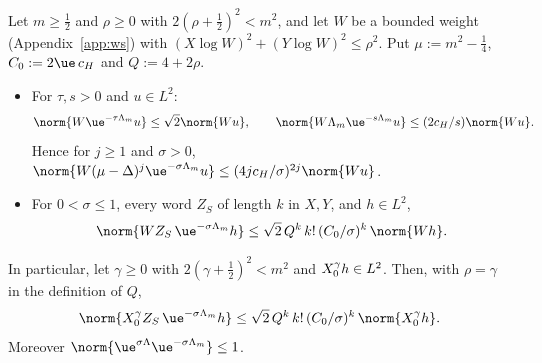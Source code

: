 \begin{lemma}\label{os:words}
Let $m\ge\tfrac12$ and $\rho\ge0$ with $2(\rho+\tfrac12)^2<m^2$, and let $W$ be a bounded weight (Appendix~\ref{app:ws}) with
$(X\log W)^2+(Y\log W)^2\le\rho^2$. Put $\mu:=m^2-\tfrac14$, $C_0:=2\ue\,c_H$ and $Q:=4+2\rho$.
\begin{itemize}
\item[(a)] For $\tau,s>0$ and $u\in L^2$:
\[
\norm{W\ue^{-\tau\Lambda_m}u}\le\sqrt2\norm{Wu},\qquad
\norm{W\Lambda_m\ue^{-s\Lambda_m}u}\le(2c_H/s)\norm{Wu}.
\]
Hence for $j\ge1$ and $\sigma>0$, $\norm{W(\mu-\Delta)^j\ue^{-\sigma\Lambda_m}u}\le(4jc_H/\sigma)^{2j}\norm{Wu}$.
\item[(b)] For $0<\sigma\le1$, every word $Z_S$ of length $k$ in $X,Y$, and $h\in L^2$,
\[
\norm{WZ_S\,\ue^{-\sigma\Lambda_m}h}\le\sqrt2\,Q^k\,k!\,(C_0/\sigma)^k\,\norm{Wh}.
\]
\end{itemize}
In particular, let $\gamma\ge0$ with $2(\gamma+\tfrac12)^2<m^2$ and $X_0^\gamma h\in L^2$. Then, with $\rho=\gamma$ in the definition of $Q$,
\[
\norm{\osX^\gamma Z_S\,\ue^{-\sigma\Lambda_m}h}\le\sqrt2\,Q^k\,k!\,(C_0/\sigma)^k\,\norm{\osX^\gamma h}.
\]
Moreover $\norm{\ue^{\sigma\osLam}\ue^{-\sigma\Lambda_m}}\le1$.
\end{lemma}
